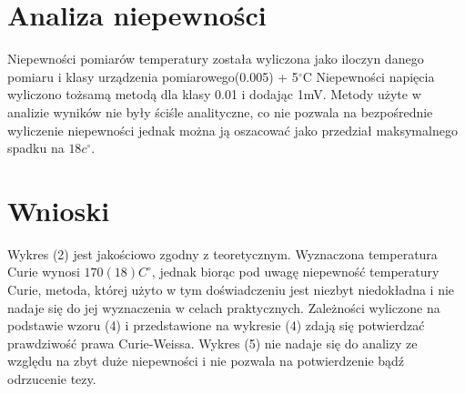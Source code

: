\documentclass[a4paper,10pt]{article}
\begin{document}
\section{Analiza niepewności}
Niepewności pomiarów temperatury została wyliczona jako iloczyn danego pomiaru i klasy urządzenia pomiarowego(0.005) + 5$^\circ$C
Niepewności napięcia wyliczono tożsamą metodą dla klasy 0.01 i dodając 1mV. Metody użyte w analizie wyników nie były ściśle analityczne, co nie pozwala na bezpośrednie wyliczenie niepewności jednak można ją oszacować jako przedział maksymalnego spadku na $18c^\circ$.

\section{Wnioski}
Wykres (2) jest jakościowo zgodny z teoretycznym. Wyznaczona temperatura Curie wynosi $170(18)C^\circ$, jednak biorąc pod uwagę niepewność temperatury Curie, metoda, której użyto w tym doświadczeniu jest niezbyt niedokładna i nie nadaje się do jej wyznaczenia w celach praktycznych. Zależności wyliczone na podstawie wzoru (4) i przedstawione na wykresie (4) zdają się potwierdzać prawdziwość prawa Curie-Weissa. Wykres (5) nie nadaje się do analizy ze względu na zbyt duże niepewności i nie pozwala na potwierdzenie bądź odrzucenie tezy.
\end{document}
